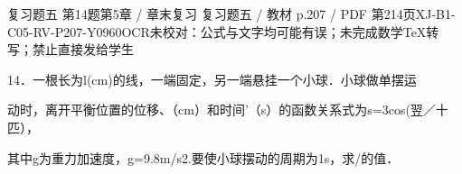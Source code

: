 \begin{bankitem}{复习题五 第14题}{第5章 / 章末复习 复习题五 / 教材 p.207 / PDF 第214页}{XJ-B1-C05-RV-P207-Y0960}{OCR未校对：公式与文字均可能有误；未完成数学TeX转写；禁止直接发给学生}
\begin{ocrdraft}
\par
14．一根长为l(cm)的线，一端固定，另一端悬挂一个小球．小球做单摆运
\par
动时，离开平衡位置的位移、（cm）和时间'（s）的函数关系式为s=3cos(翌／十匹），
\par
其中g为重力加速度，g=9.8m/s2.要使小球摆动的周期为1s，求/的值．
\end{ocrdraft}
\end{bankitem}
